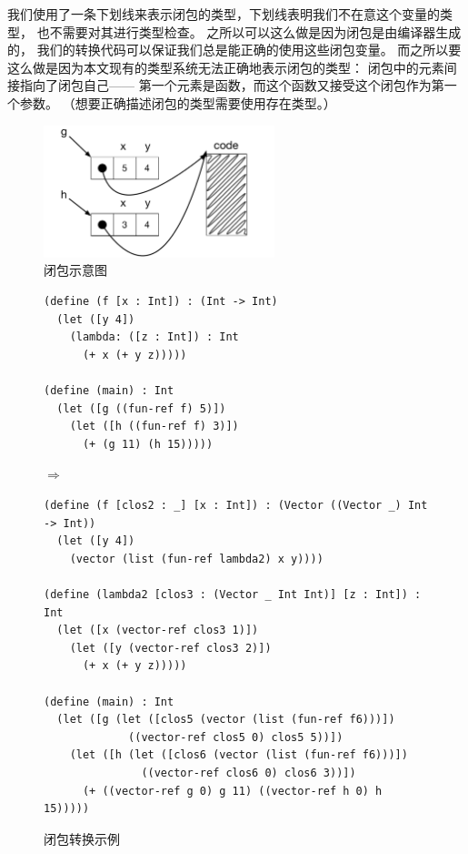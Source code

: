 我们使用了一条下划线来表示闭包的类型，下划线表明我们不在意这个变量的类型，
也不需要对其进行类型检查。
之所以可以这么做是因为闭包是由编译器生成的，
我们的转换代码可以保证我们总是能正确的使用这些闭包变量。
而之所以要这么做是因为本文现有的类型系统无法正确地表示闭包的类型：
闭包中的元素间接指向了闭包自己——
第一个元素是函数，而这个函数又接受这个闭包作为第一个参数。
（想要正确描述闭包的类型需要使用存在类型\cite{Minamide_Morrisett_Harper_1996}。）

\begin{figure}[t]
\centering \includegraphics[width=0.6\textwidth]{figures/closures}
\caption{闭包示意图}
\label{fig:closure-eg}
\end{figure}

\begin{figure}[tbp]
  \begin{minipage}{0.8\textwidth}
\begin{lstlisting}[basicstyle=\ttfamily\footnotesize]
(define (f [x : Int]) : (Int -> Int)
  (let ([y 4])
    (lambda: ([z : Int]) : Int
      (+ x (+ y z)))))

(define (main) : Int
  (let ([g ((fun-ref f) 5)])
    (let ([h ((fun-ref f) 3)])
      (+ (g 11) (h 15)))))
\end{lstlisting}
$\Rightarrow$
\begin{lstlisting}[basicstyle=\ttfamily\footnotesize]
(define (f [clos2 : _] [x : Int]) : (Vector ((Vector _) Int -> Int))
  (let ([y 4])
    (vector (list (fun-ref lambda2) x y))))

(define (lambda2 [clos3 : (Vector _ Int Int)] [z : Int]) : Int
  (let ([x (vector-ref clos3 1)])
    (let ([y (vector-ref clos3 2)])
      (+ x (+ y z)))))

(define (main) : Int
  (let ([g (let ([clos5 (vector (list (fun-ref f6)))])
             ((vector-ref clos5 0) clos5 5))])
    (let ([h (let ([clos6 (vector (list (fun-ref f6)))])
               ((vector-ref clos6 0) clos6 3))])
      (+ ((vector-ref g 0) g 11) ((vector-ref h 0) h 15)))))
\end{lstlisting}
\end{minipage}

\caption{闭包转换示例}
\label{fig:colure-conversion-eg}
\end{figure}


